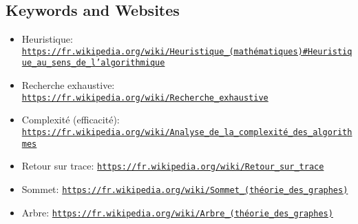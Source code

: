 \documentclass[a4paper,11pt]{report}
\newcommand{\BrochureUrlText}[1]{\texttt{#1}}
\begin{document}
{\raggedright

\subsection*{Keywords and Websites}

\begin{itemize}
  \item Heuristique: \href{https://fr.wikipedia.org/wiki/Heuristique_(math\%C3\%A9matiques)\#Heuristique_au_sens_de_l'algorithmique}{\BrochureUrlText{https://fr.wikipedia.org/wiki/Heuristique\_(mathématiques)\#Heuristique\_au\_sens\_de\_l’algorithmique}}
  \item Recherche exhaustive: \href{https://fr.wikipedia.org/wiki/Recherche_exhaustive}{\BrochureUrlText{https://fr.wikipedia.org/wiki/Recherche\_exhaustive}}
  \item Complexité (efficacité): \href{https://fr.wikipedia.org/wiki/Analyse_de_la_complexit\%C3\%A9_des_algorithmes}{\BrochureUrlText{https://fr.wikipedia.org/wiki/Analyse\_de\_la\_complexité\_des\_algorithmes}}
  \item Retour sur trace: \href{https://fr.wikipedia.org/wiki/Retour_sur_trace}{\BrochureUrlText{https://fr.wikipedia.org/wiki/Retour\_sur\_trace}}
  \item Sommet: \href{https://fr.wikipedia.org/wiki/Sommet_(th\%C3\%A9orie_des_graphes)}{\BrochureUrlText{https://fr.wikipedia.org/wiki/Sommet\_(théorie\_des\_graphes)}}
  \item Arbre: \href{https://fr.wikipedia.org/wiki/Arbre_(th\%C3\%A9orie_des_graphes)}{\BrochureUrlText{https://fr.wikipedia.org/wiki/Arbre\_(théorie\_des\_graphes)}}
\end{itemize}


}
\end{document}
